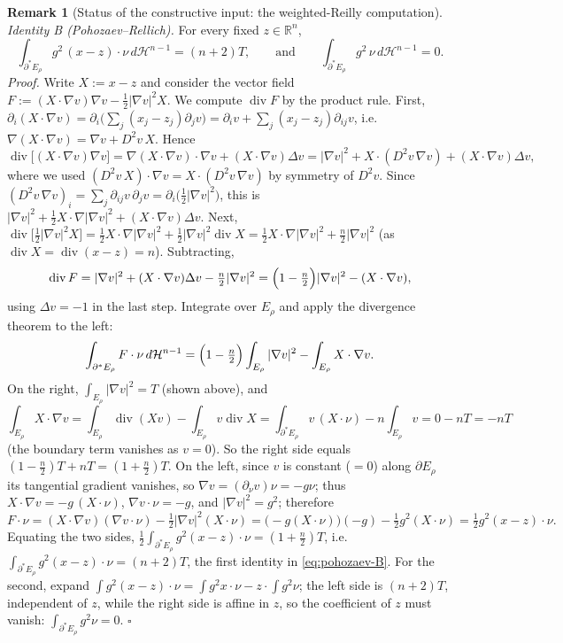 \documentclass[11pt]{amsart}
\theoremstyle{definition}
\newtheorem{remark}[theorem]{Remark}
\newcommand{\R}{\mathbb R}
\newcommand{\Hn}{\mathcal H^{n-1}}
\begin{document}
\begin{remark}[Status of the constructive input: the weighted-Reilly computation]
\emph{Identity B (Pohozaev--Rellich).}  For every fixed \(z\in\R^n\),
\begin{equation}\label{eq:pohozaev-B}
   \int_{\partial^*E_\rho}g^2\,(x-z)\cdot\nu\,d\Hn=(n+2)T,
   \qquad\text{and}\qquad
   \int_{\partial^*E_\rho}g^2\,\nu\,d\Hn=0 .
\end{equation}
\emph{Proof.}  Write \(X:=x-z\) and consider the vector field
\(F:=(X\cdot\nabla v)\nabla v-\tfrac12|\nabla v|^2X\).  We compute
\(\operatorname{div}F\) by the product rule.  First,
\(\partial_i(X\cdot\nabla v)=\partial_i\bigl(\sum_j(x_j-z_j)\partial_jv\bigr)
=\partial_iv+\sum_j(x_j-z_j)\partial_{ij}v\), i.e.\
\(\nabla(X\cdot\nabla v)=\nabla v+D^2v\,X\).  Hence
\[
   \operatorname{div}\bigl[(X\cdot\nabla v)\nabla v\bigr]
   =\nabla(X\cdot\nabla v)\cdot\nabla v+(X\cdot\nabla v)\Delta v
   =|\nabla v|^2+X\cdot(D^2v\,\nabla v)+(X\cdot\nabla v)\Delta v,
\]
where we used \((D^2v\,X)\cdot\nabla v=X\cdot(D^2v\,\nabla v)\) by symmetry of
\(D^2v\).  Since \((D^2v\,\nabla v)_i=\sum_j\partial_{ij}v\,\partial_jv
=\partial_i\bigl(\tfrac12|\nabla v|^2\bigr)\), this is
\(|\nabla v|^2+\tfrac12X\cdot\nabla|\nabla v|^2+(X\cdot\nabla v)\Delta v\).  Next,
\(\operatorname{div}\bigl[\tfrac12|\nabla v|^2X\bigr]
=\tfrac12X\cdot\nabla|\nabla v|^2+\tfrac12|\nabla v|^2\operatorname{div}X
=\tfrac12X\cdot\nabla|\nabla v|^2+\tfrac n2|\nabla v|^2\)
(as \(\operatorname{div}X=\operatorname{div}(x-z)=n\)).  Subtracting,
\[
   \operatorname{div}F
   =|\nabla v|^2+(X\cdot\nabla v)\Delta v-\tfrac n2|\nabla v|^2
   =\Bigl(1-\tfrac n2\Bigr)|\nabla v|^2-(X\cdot\nabla v),
\]
using \(\Delta v=-1\) in the last step.  Integrate over \(E_\rho\) and apply the
divergence theorem to the left:
\[
   \int_{\partial^*E_\rho}F\cdot\nu\,d\Hn
   =\Bigl(1-\tfrac n2\Bigr)\int_{E_\rho}|\nabla v|^2-\int_{E_\rho}X\cdot\nabla v .
\]
On the right, \(\int_{E_\rho}|\nabla v|^2=T\) (shown above), and
\[
   \int_{E_\rho}X\cdot\nabla v
   =\int_{E_\rho}\operatorname{div}(Xv)-\int_{E_\rho}v\operatorname{div}X
   =\int_{\partial^*E_\rho}v\,(X\cdot\nu)-n\int_{E_\rho}v=0-nT=-nT
\]
(the boundary term vanishes as \(v=0\)).  So the right side equals
\((1-\tfrac n2)T+nT=(1+\tfrac n2)T\).  On the left, since \(v\) is constant (\(=0\)) along \(\partial E_\rho\) its
tangential gradient vanishes, so \(\nabla v=(\partial_\nu v)\nu=-g\nu\); thus
\(X\cdot\nabla v=-g\,(X\cdot\nu)\), \(\nabla v\cdot\nu=-g\), and
\(|\nabla v|^2=g^2\); therefore
\[
   F\cdot\nu=(X\cdot\nabla v)(\nabla v\cdot\nu)-\tfrac12|\nabla v|^2(X\cdot\nu)
   =\bigl(-g(X\cdot\nu)\bigr)(-g)-\tfrac12g^2(X\cdot\nu)
   =\tfrac12g^2(x-z)\cdot\nu .
\]
Equating the two sides, \(\tfrac12\int_{\partial^*E_\rho}g^2(x-z)\cdot\nu
=(1+\tfrac n2)T\), i.e.\ \(\int_{\partial^*E_\rho}g^2(x-z)\cdot\nu=(n+2)T\), the
first identity in \eqref{eq:pohozaev-B}.  For the second, expand
\(\int g^2(x-z)\cdot\nu=\int g^2x\cdot\nu-z\cdot\int g^2\nu\); the left side is
\((n+2)T\), independent of \(z\), while the right side is affine in \(z\), so the
coefficient of \(z\) must vanish: \(\int_{\partial^*E_\rho}g^2\nu=0\).
\hfill\(\square\)


\end{remark}
\end{document}

